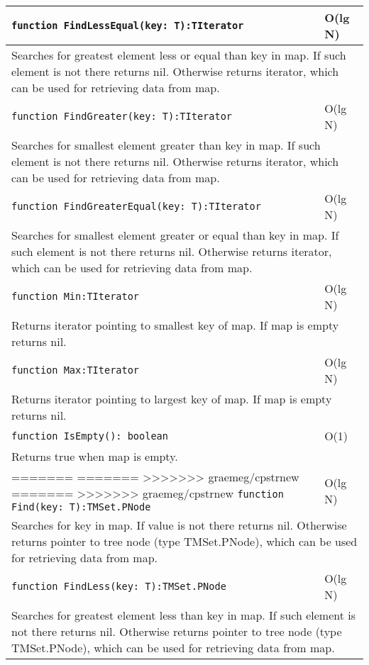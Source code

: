 \begin{longtable}{|m{10cm}|m{5cm}|}
\verb!function FindLessEqual(key: T):TIterator! & O(lg N) \\\hline
\multicolumn{2}{|m{15cm}|}{Searches for greatest element less or equal than key in map. If such element is not there returns nil. Otherwise
returns iterator, which can be used for retrieving data from map.} \\\hline\hline

\verb!function FindGreater(key: T):TIterator! & O(lg N) \\\hline
\multicolumn{2}{|m{15cm}|}{Searches for smallest element greater than key in map. If such element is not there returns nil. Otherwise
returns iterator, which can be used for retrieving data from map.} \\\hline\hline

\verb!function FindGreaterEqual(key: T):TIterator! & O(lg N) \\\hline
\multicolumn{2}{|m{15cm}|}{Searches for smallest element greater or equal than key in map. If such element is not there returns nil. Otherwise
returns iterator, which can be used for retrieving data from map.} \\\hline\hline

\verb!function Min:TIterator! & O(lg N) \\\hline
\multicolumn{2}{|m{15cm}|}{Returns iterator pointing to smallest key of map. If map is empty returns
nil.} \\\hline\hline

\verb!function Max:TIterator! & O(lg N) \\\hline
\multicolumn{2}{|m{15cm}|}{Returns iterator pointing to largest key of map. If map is empty returns
nil.} \\\hline\hline

\verb!function IsEmpty(): boolean! & O(1) \\ \hline
\multicolumn{2}{|m{15cm}|}{Returns true when map is empty.} \\\hline

=======
=======
>>>>>>> graemeg/cpstrnew
=======
>>>>>>> graemeg/cpstrnew
\verb!function Find(key: T):TMSet.PNode! & O(lg N) \\\hline
\multicolumn{2}{|m{15cm}|}{Searches for key in map. If value is not there returns nil. Otherwise
returns pointer to tree node (type TMSet.PNode), which can be used for retrieving data from map.} \\\hline\hline

\verb!function FindLess(key: T):TMSet.PNode! & O(lg N) \\\hline
\multicolumn{2}{|m{15cm}|}{Searches for greatest element less than key in map. If such element is not there returns nil. Otherwise
returns pointer to tree node (type TMSet.PNode), which can be used for retrieving data from map.} \\\hline\hline


\end{longtable}
